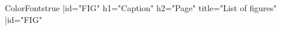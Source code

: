 


%
%
\CropMarkstrue


\csname ColorFontstrue\endcsname
{}
\ptxfile{}
\prepusfm
\ztoc|id="FIG" h1="Caption" h2="Page" title="List of figures"\*
\ztoc|id="FIG"\*
\unprepusfm
\unbalancedtrue
\lastptxfiletrue
{}
~
\supereject
\bye
